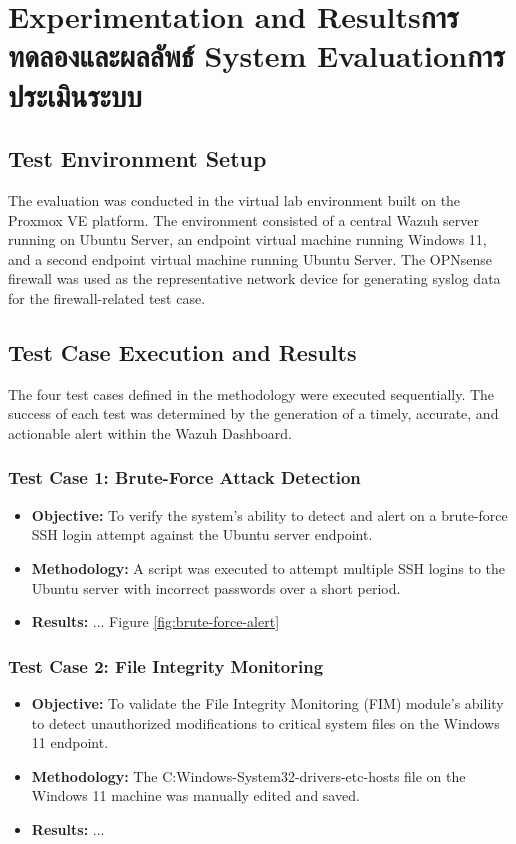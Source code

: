 \chapter{\ifproject%
\ifenglish Experimentation and Results\else การทดลองและผลลัพธ์\fi
\else%
\ifenglish System Evaluation\else การประเมินระบบ\fi
\fi}
\label{ch:evaluation}

\section{Test Environment Setup}
\label{sec:test-env}
The evaluation was conducted in the virtual lab environment built on the Proxmox VE platform. The environment consisted of a central Wazuh server running on Ubuntu Server, an endpoint virtual machine running Windows 11, and a second endpoint virtual machine running Ubuntu Server. The OPNsense firewall was used as the representative network device for generating syslog data for the firewall-related test case.


\section{Test Case Execution and Results}
\label{sec:test-results}
The four test cases defined in the methodology were executed sequentially. The success of each test was determined by the generation of a timely, accurate, and actionable alert within the Wazuh Dashboard.

\subsection{Test Case 1: Brute-Force Attack Detection}
\begin{itemize}
    \item \textbf{Objective:} To verify the system's ability to detect and alert on a brute-force SSH login attempt against the Ubuntu server endpoint.
    \item \textbf{Methodology:} A script was executed to attempt multiple SSH logins to the Ubuntu server with incorrect passwords over a short period.
    \item \textbf{Results:} ...
    Figure \ref{fig:brute-force-alert}
\end{itemize}

\subsection{Test Case 2: File Integrity Monitoring}
\begin{itemize}
    \item \textbf{Objective:} To validate the File Integrity Monitoring (FIM) module's ability to detect unauthorized modifications to critical system files on the Windows 11 endpoint.
    \item \textbf{Methodology:} The C:Windows-System32-drivers-etc-hosts file on the Windows 11 machine was manually edited and saved.
    \item \textbf{Results:} ...
\end{itemize}

